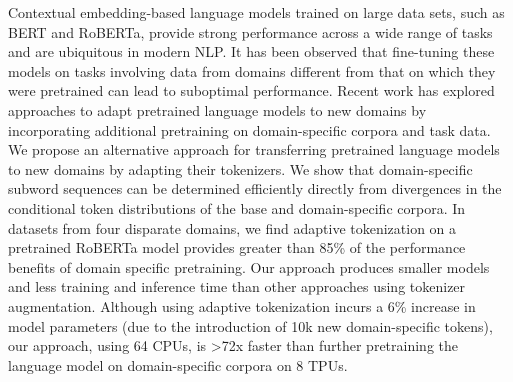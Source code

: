 Contextual embedding-based language models trained on large data sets, such as BERT and RoBERTa, provide strong performance across a wide range of tasks and are ubiquitous in modern NLP. It has been observed that fine-tuning these models on tasks involving data from domains different from that on which they were pretrained can lead to suboptimal performance. Recent work has explored approaches to adapt pretrained language models to new domains by incorporating additional pretraining on domain-specific corpora and task data. We propose an alternative approach for transferring pretrained language models to new domains by adapting their tokenizers. We show that domain-specific subword sequences can be determined efficiently directly from divergences in the conditional token distributions of the base and domain-specific corpora. In datasets from four disparate domains, we find adaptive tokenization on a pretrained RoBERTa model provides greater than 85\% of the performance benefits of domain specific pretraining. Our approach produces smaller models and less training and inference time than other approaches using tokenizer augmentation. Although using adaptive tokenization incurs a 6\% increase in model parameters (due to the introduction of 10k new domain-specific tokens), our approach, using 64 CPUs, is >72x faster than further pretraining the language model on domain-specific corpora on 8 TPUs.
